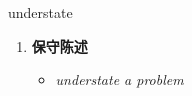 
\begin{frame}
{\huge understate}
\begin{center}
\begin{enumerate}\Large
  \item \textbf{保守陈述}
  \begin{itemize}
    \item \em{\Large{understate a problem}}
  \end{itemize}
\end{enumerate}
\end{center}
\end{frame}
